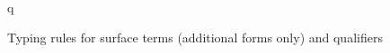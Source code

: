 \begin{figure}[H]
\vspace{0.1em}

\flushleft {}
\begin{smathpar}
{
   \Gamma \vdash q \concat {} \dashv \Delta
}
\end{smathpar}

\caption{Typing rules for surface terms (additional forms only) and qualifiers}
\end{figure}

